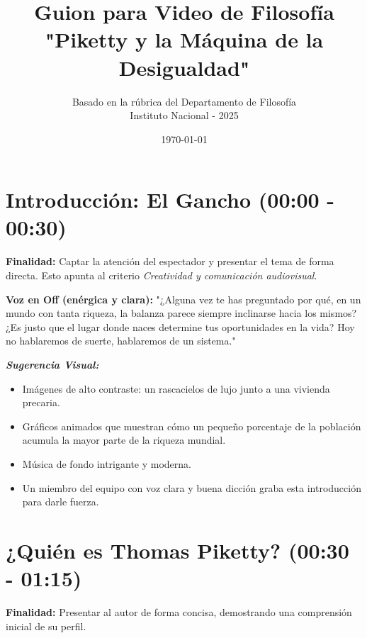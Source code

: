 \documentclass[12pt, a4paper]{article}
\title{
    \Huge Guion para Video de Filosofía \\
    \vspace{0.5cm}
    \Large \textbf{"Piketty y la Máquina de la Desigualdad"}
}
\author{Basado en la rúbrica del Departamento de Filosofía \\ Instituto Nacional - 2025}
\date{\today}
\begin{document}
\maketitle
\thispagestyle{empty} %
\tableofcontents
\newpage

\section{Introducción: El Gancho (00:00 - 00:30)}

\textbf{Finalidad:} Captar la atención del espectador y presentar el tema de forma directa. Esto apunta al criterio \textit{Creatividad y comunicación audiovisual}.

\vspace{0.5cm}

\textbf{Voz en Off (enérgica y clara):}
"¿Alguna vez te has preguntado por qué, en un mundo con tanta riqueza, la balanza parece siempre inclinarse hacia los mismos? ¿Es justo que el lugar donde naces determine tus oportunidades en la vida? Hoy no hablaremos de suerte, hablaremos de un sistema."

\vspace{0.5cm}

\textit{\textbf{Sugerencia Visual:}} 
\begin{itemize}
    \item Imágenes de alto contraste: un rascacielos de lujo junto a una vivienda precaria.
    \item Gráficos animados que muestran cómo un pequeño porcentaje de la población acumula la mayor parte de la riqueza mundial.
    \item Música de fondo intrigante y moderna.
    \item Un miembro del equipo con voz clara y buena dicción graba esta introducción para darle fuerza.
\end{itemize}

\section{¿Quién es Thomas Piketty? (00:30 - 01:15)}

\textbf{Finalidad:} Presentar al autor de forma concisa, demostrando una comprensión inicial de su perfil.
\end{document}
